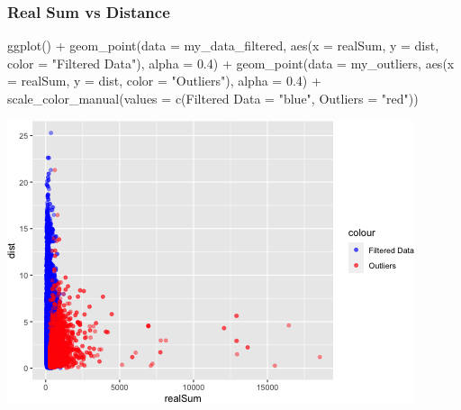 \documentclass[
]{article}
\newenvironment{Shaded}{\begin{snugshade}}{\end{snugshade}}
\newcommand{\AttributeTok}[1]{\textcolor[rgb]{0.77,0.63,0.00}{#1}}
\newcommand{\FloatTok}[1]{\textcolor[rgb]{0.00,0.00,0.81}{#1}}
\newcommand{\FunctionTok}[1]{\textcolor[rgb]{0.00,0.00,0.00}{#1}}
\newcommand{\NormalTok}[1]{#1}
\newcommand{\OtherTok}[1]{\textcolor[rgb]{0.56,0.35,0.01}{#1}}
\newcommand{\SpecialCharTok}[1]{\textcolor[rgb]{0.00,0.00,0.00}{#1}}
\newcommand{\StringTok}[1]{\textcolor[rgb]{0.31,0.60,0.02}{#1}}
\begin{document}
\hypertarget{real-sum-vs-distance}{%
\subsubsection{Real Sum vs Distance}\label{real-sum-vs-distance}}

\begin{Shaded}
\begin{Highlighting}[]
\FunctionTok{ggplot}\NormalTok{() }\SpecialCharTok{+} \FunctionTok{geom\_point}\NormalTok{(}\AttributeTok{data =}\NormalTok{ my\_data\_filtered, }\FunctionTok{aes}\NormalTok{(}\AttributeTok{x =}\NormalTok{ realSum,}
    \AttributeTok{y =}\NormalTok{ dist, }\AttributeTok{color =} \StringTok{"Filtered Data"}\NormalTok{), }\AttributeTok{alpha =} \FloatTok{0.4}\NormalTok{) }\SpecialCharTok{+} \FunctionTok{geom\_point}\NormalTok{(}\AttributeTok{data =}\NormalTok{ my\_outliers,}
    \FunctionTok{aes}\NormalTok{(}\AttributeTok{x =}\NormalTok{ realSum, }\AttributeTok{y =}\NormalTok{ dist, }\AttributeTok{color =} \StringTok{"Outliers"}\NormalTok{), }\AttributeTok{alpha =} \FloatTok{0.4}\NormalTok{) }\SpecialCharTok{+}
    \FunctionTok{scale\_color\_manual}\NormalTok{(}\AttributeTok{values =} \FunctionTok{c}\NormalTok{(}\StringTok{\textasciigrave{}}\AttributeTok{Filtered Data}\StringTok{\textasciigrave{}} \OtherTok{=} \StringTok{"blue"}\NormalTok{, }\AttributeTok{Outliers =} \StringTok{"red"}\NormalTok{))}
\end{Highlighting}
\end{Shaded}

\includegraphics{Project_files/figure-latex/unnamed-chunk-15-1.png}
\end{document}
